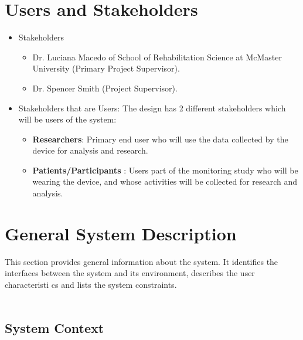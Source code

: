 \documentclass[12pt]{article}
\begin{document}
\section{Users and Stakeholders}
\label{Users_Stakeholders}
\begin{itemize}
\item Stakeholders

	\begin{itemize}
		\item  Dr. Luciana Macedo of School of Rehabilitation Science at McMaster University (Primary Project Supervisor).
		\item  Dr. Spencer Smith (Project Supervisor).
	\end{itemize}

\item Stakeholders that are Users: The design has 2 different stakeholders which will be users of the system:
	\begin{itemize}
		\item \textbf{Researchers}: Primary end user who will use the data collected by the device for analysis and research.
		\item \textbf{Patients/Participants} : Users part of the monitoring study who will be wearing the device, and whose activities will be collected for research and analysis.
	\end{itemize}
\end{itemize}

\section{General System Description}
\label{GSD}
This section provides general information about the system.  It identifies the
interfaces between the system and its environment, describes the user
characteristi	cs and lists the system constraints.  \\\\
\subsection{System Context}
\end{document}
